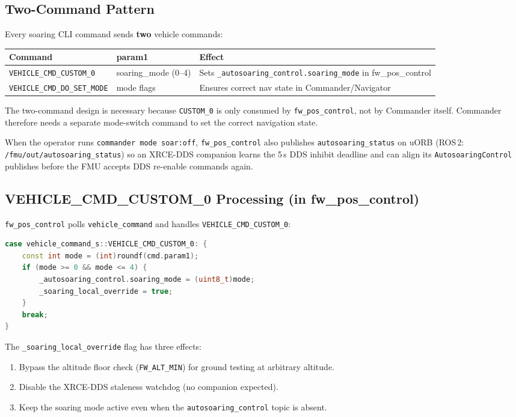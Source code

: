 \documentclass[12pt,a4paper]{article}
\begin{document}
\subsection{Two-Command Pattern}

Every soaring CLI command sends \textbf{two} vehicle commands:

\begin{center}\begin{tabular}{lll}\toprule
Command & param1 & Effect \\\midrule
\texttt{VEHICLE\_CMD\_CUSTOM\_0} & soaring\_mode (0--4) & Sets \texttt{\_autosoaring\_control.soaring\_mode} in fw\_pos\_control \\
\texttt{VEHICLE\_CMD\_DO\_SET\_MODE} & mode flags & Ensures correct nav state in Commander/Navigator \\
\bottomrule\end{tabular}\end{center}

The two-command design is necessary because \texttt{CUSTOM\_0} is only consumed by
\texttt{fw\_pos\_control}, not by Commander itself. Commander therefore needs a
separate mode-switch command to set the correct navigation state.

When the operator runs \texttt{commander mode soar:off}, \texttt{fw\_pos\_control}
also publishes \texttt{autosoaring\_status} on uORB (ROS\,2:
\texttt{/fmu/out/autosoaring\_status}) so an XRCE-DDS companion learns the
5\,s DDS inhibit deadline and can align its \texttt{AutosoaringControl}
publishes before the FMU accepts DDS re-enable commands again.

\subsection{VEHICLE\_CMD\_CUSTOM\_0 Processing (in fw\_pos\_control)}

\texttt{fw\_pos\_control} polls \texttt{vehicle\_command} and handles
\texttt{VEHICLE\_CMD\_CUSTOM\_0}:
\begin{lstlisting}[language=C++]
case vehicle_command_s::VEHICLE_CMD_CUSTOM_0: {
    const int mode = (int)roundf(cmd.param1);
    if (mode >= 0 && mode <= 4) {
        _autosoaring_control.soaring_mode = (uint8_t)mode;
        _soaring_local_override = true;
    }
    break;
}
\end{lstlisting}

The \texttt{\_soaring\_local\_override} flag has three effects:
\begin{enumerate}
  \item Bypass the altitude floor check (\texttt{FW\_ALT\_MIN}) for ground
        testing at arbitrary altitude.
  \item Disable the XRCE-DDS staleness watchdog (no companion expected).
  \item Keep the soaring mode active even when the
        \texttt{autosoaring\_control} topic is absent.
\end{enumerate}
\end{document}
